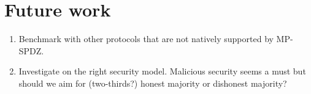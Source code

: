 \section{Future work}

\begin{enumerate}
	\item Benchmark with other protocols that are not natively supported by MP-SPDZ.
	\item Investigate on the right security model. Malicious security seems a must but should we aim for (two-thirds?) honest majority or dishonest majority? 
\end{enumerate}